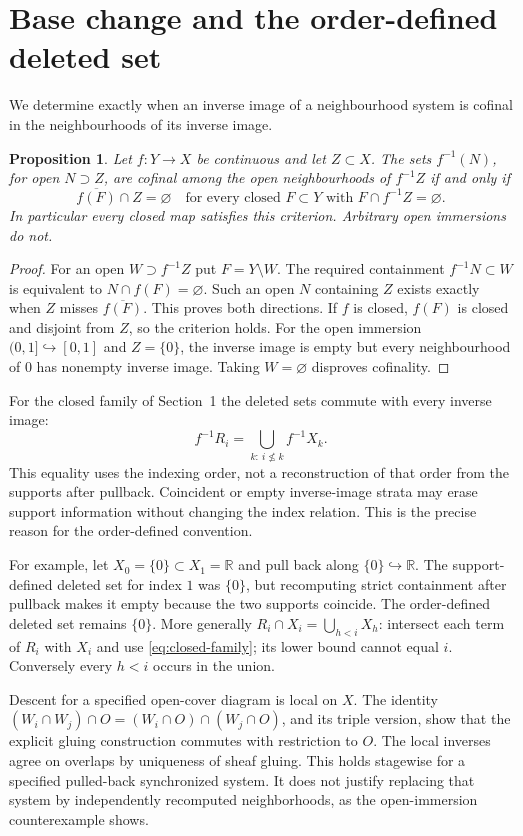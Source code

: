 \documentclass[11pt,a4paper]{article}
\newtheorem{proposition}[theorem]{Proposition}
\theoremstyle{definition}
\newcommand{\R}{\mathbb R}
\begin{document}
\section{Base change and the order-defined deleted set}
We determine exactly when an inverse image of a neighbourhood system is cofinal in the neighbourhoods of its inverse image.

\begin{proposition}\label{prop:basechange}
Let $f:Y\to X$ be continuous and let $Z\subset X$. The sets $f^{-1}(N)$, for open $N\supset Z$, are cofinal among the open neighbourhoods of $f^{-1}Z$ if and only if
\[
 \overline{f(F)}\cap Z=\varnothing
 \quad\text{for every closed }F\subset Y\text{ with }F\cap f^{-1}Z=\varnothing.
\]
In particular every closed map satisfies this criterion. Arbitrary open immersions do not.
\end{proposition}
\begin{proof}
For an open $W\supset f^{-1}Z$ put $F=Y\setminus W$. The required containment $f^{-1}N\subset W$ is equivalent to $N\cap f(F)=\varnothing$. Such an open $N$ containing $Z$ exists exactly when $Z$ misses $\overline{f(F)}$. This proves both directions. If $f$ is closed, $f(F)$ is closed and disjoint from $Z$, so the criterion holds. For the open immersion $(0,1]\hookrightarrow[0,1]$ and $Z=\{0\}$, the inverse image is empty but every neighbourhood of $0$ has nonempty inverse image. Taking $W=\varnothing$ disproves cofinality.
\end{proof}

For the closed family of Section~1 the deleted sets commute with every inverse image:
\[
 f^{-1}R_i=\bigcup_{k:\ i\nleq k}f^{-1}X_k.
\]
This equality uses the indexing order, not a reconstruction of that order from the supports after pullback. Coincident or empty inverse-image strata may erase support information without changing the index relation. This is the precise reason for the order-defined convention.


For example, let $X_0=\{0\}\subset X_1=\R$ and pull back along
$\{0\}\hookrightarrow\R$. The support-defined deleted set for index
$1$ was $\{0\}$, but recomputing strict containment after pullback makes
it empty because the two supports coincide. The order-defined deleted
set remains $\{0\}$. More generally
$R_i\cap X_i=\bigcup_{h<i}X_h$: intersect each term of $R_i$ with
$X_i$ and use \eqref{eq:closed-family}; its lower bound cannot equal
$i$. Conversely every $h<i$ occurs in the union.

Descent for a specified open-cover diagram is local on $X$.
The identity $(W_i\cap W_j)\cap O=(W_i\cap O)\cap(W_j\cap O)$,
and its triple version, show that the explicit gluing construction
commutes with restriction to $O$. The local inverses agree on overlaps
by uniqueness of sheaf gluing. This holds stagewise for a specified
pulled-back synchronized system. It does not justify replacing that
system by independently recomputed neighborhoods, as the open-immersion
counterexample shows.
\end{document}
